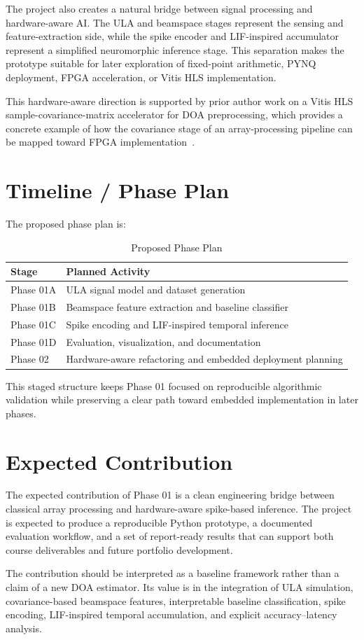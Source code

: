 \documentclass[11pt]{report}
\begin{document}
The project also creates a natural bridge between signal processing and hardware-aware AI. The ULA and beamspace stages represent the sensing and feature-extraction side, while the spike encoder and LIF-inspired accumulator represent a simplified neuromorphic inference stage. This separation makes the prototype suitable for later exploration of fixed-point arithmetic, PYNQ deployment, FPGA acceleration, or Vitis HLS implementation.

This hardware-aware direction is supported by prior author work on a Vitis HLS sample-covariance-matrix accelerator for DOA preprocessing, which provides a concrete example of how the covariance stage of an array-processing pipeline can be mapped toward FPGA implementation~\cite{molhem2026scmhls}.

\section{Timeline / Phase Plan}

The proposed phase plan is:

\begin{table}[h]
\centering
\caption{Proposed Phase Plan}
\label{tab:phase_plan}
\begin{tabular}{ll}
\toprule
Stage & Planned Activity \\
\midrule
Phase 01A & ULA signal model and dataset generation \\
Phase 01B & Beamspace feature extraction and baseline classifier \\
Phase 01C & Spike encoding and LIF-inspired temporal inference \\
Phase 01D & Evaluation, visualization, and documentation \\
Phase 02 & Hardware-aware refactoring and embedded deployment planning \\
\bottomrule
\end{tabular}
\end{table}

This staged structure keeps Phase 01 focused on reproducible algorithmic validation while preserving a clear path toward embedded implementation in later phases.

\section{Expected Contribution}

The expected contribution of Phase 01 is a clean engineering bridge between classical array processing and hardware-aware spike-based inference. The project is expected to produce a reproducible Python prototype, a documented evaluation workflow, and a set of report-ready results that can support both course deliverables and future portfolio development.

The contribution should be interpreted as a baseline framework rather than a claim of a new DOA estimator. Its value is in the integration of ULA simulation, covariance-based beamspace features, interpretable baseline classification, spike encoding, LIF-inspired temporal accumulation, and explicit accuracy--latency analysis.

\clearpage
{}
{}


\end{document}
